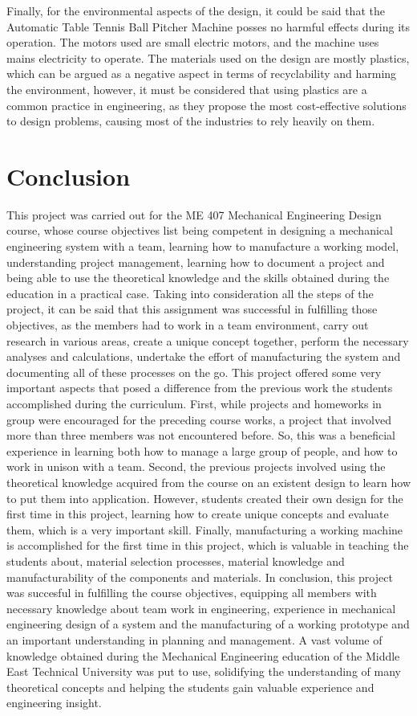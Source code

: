 \documentclass[12pt]{report}
\begin{document}
Finally, for the environmental aspects of the design, it could be said that the Automatic Table Tennis Ball Pitcher Machine posses no harmful effects during its operation. The motors used are small electric motors, and the machine uses mains electricity to operate. The materials used on the design are mostly plastics, which can be argued as a negative aspect in terms of recyclability and harming the environment, however, it must be considered that using plastics are a common practice in engineering, as they propose the most cost-effective solutions to design problems, causing most of the industries to rely heavily on them.


\chapter{Conclusion}

This project was carried out for the ME 407 Mechanical Engineering Design course, whose course objectives list being competent in designing a mechanical engineering system with a team, learning how to manufacture a working model, understanding project management, learning how to document a project and being able to use the theoretical knowledge and the skills obtained during the education in a practical case. Taking into consideration all the steps of the project, it can be said that this assignment was successful in fulfilling those objectives, as the members had to work in a team environment, carry out research in various areas, create a unique concept together, perform the necessary analyses and calculations, undertake the effort of manufacturing the system and documenting all of these processes on the go.  
This project offered some very important aspects that posed a difference from the previous work the students accomplished during the curriculum. First, while projects and homeworks in group were encouraged for the preceding course works, a project that involved more than three members was not encountered before. So, this was a beneficial experience in learning both how to manage a large group of people, and how to work in unison with a team. Second, the previous projects involved using the theoretical knowledge acquired from the course on an existent design to learn how to put them into application. However, students created their own design for the first time in this project, learning how to create unique concepts and evaluate them, which is a very important skill. Finally, manufacturing a working machine is accomplished for the first time in this project, which is valuable in teaching the students about, material selection processes, material knowledge and manufacturability of the components and materials.
In conclusion, this project was succesful in fulfilling the course objectives, equipping all members with necessary knowledge about team work in engineering, experience in mechanical engineering design of a system and the manufacturing of a working prototype and an important understanding in planning and management. A vast volume of knowledge obtained during the Mechanical Engineering education of the Middle East Technical University was put to use, solidifying the understanding of many theoretical concepts and helping the students gain valuable experience and engineering insight.
\end{document}
